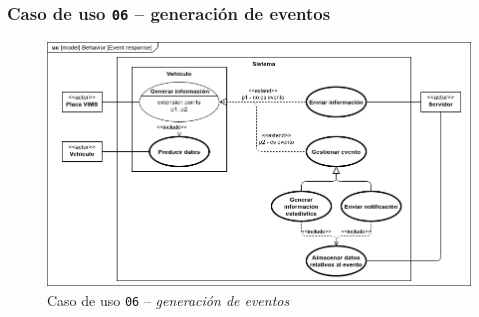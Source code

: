 \subsubsection{Caso de uso \texttt{06} -- generación de eventos}

\begin{figure}[H]
  \centering
  \includegraphics[width=\linewidth]{diagrams/UseCases-UC6 - reaction.png}
  \caption{Caso de uso \texttt{06} -- \textit{generación de eventos}}
  \label{uc:reaction}
\end{figure}

